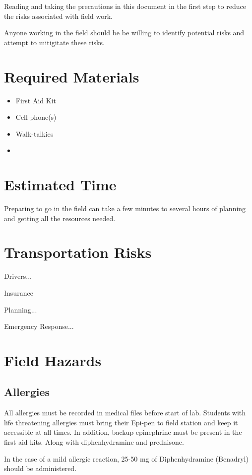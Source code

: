 \documentclass[12pt]{../SOP3_beta}
\begin{document}
\NP Reading and taking the precautions in this document in the first step to reduce the risks associated with field work. 

\NP Anyone working in the field should be be willing to identify potential risks and attempt to mitigitate these risks. 

\section{Required Materials}

\begin{itemize}
  \item First Aid Kit
  \item Cell phone(s)
  \item Walk-talkies
  \item 
\end{itemize}

\section{Estimated Time}

\NP Preparing to go in the field can take a few minutes to several hours of planning and getting all the resources needed.

\section{Transportation Risks}

\NP Drivers...

\NP Insurance

\NP Planning...

\NP Emergency Response...


\section{Field Hazards}

\subsection{Allergies}

\NP All allergies must be recorded in medical files before start of lab. Students with life threatening allergies must bring their Epi-pen to field station and keep it accessible at all times. In addition, backup epinephrine must be present in the first aid kits. Along with diphenhydramine and prednisone. 

\NP In the case of a mild allergic reaction, 25-50 mg of Diphenhydramine (Benadryl) should be administered. 
\end{document}
